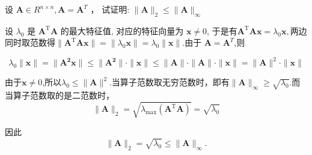 \begin{tcolorbox}[enhanced,colback=10,colframe=9,breakable,coltitle=green!25!black,title=2024]
  
设 $\boldsymbol{A} \in R^{n \times n}, \boldsymbol{A}=\boldsymbol{A}^{T} $ ，
试证明: $ \|\boldsymbol{A}\|_{2} \leq\|\boldsymbol{A}\|_{\infty} $
\tcblower

 设 $ \lambda_0 $ 是 $\boldsymbol{A}^{\mathrm{T}} \boldsymbol{A} $ 的最大特征值, 对应的特征向量为 $\boldsymbol{x} \neq 0 $, 于是有$\boldsymbol{A}^{\mathrm{T}} \boldsymbol{A x}=\lambda_0 \boldsymbol{x},$两边同时取范数得$\|\boldsymbol{A}^{\mathrm{T}} \boldsymbol{A x}\|=\|\lambda_0 \boldsymbol{x}\|=\lambda_0\|\boldsymbol{x}\|$.由于 $\boldsymbol{A}=\boldsymbol{A}^{T}$,则

 $$\lambda_0\|\boldsymbol{x}\|=\|\boldsymbol{A^2 x}\|\leqslant \|\boldsymbol{A^2}\|\cdot \|\boldsymbol{ x}\|\leqslant \|\boldsymbol{A}\|\cdot \|\boldsymbol{A}\|\cdot \|\boldsymbol{x}\|=\|\boldsymbol{A}\|^2 \cdot \|\boldsymbol{x}\|$$

 由于$\boldsymbol{x} \neq 0 $,所以$\lambda_0\leqslant \|\boldsymbol{A}\|^2$.当算子范数取无穷范数时，即有$\|\boldsymbol{A}\|_{\infty}\geqslant \sqrt{\lambda_0}$.而当算子范数取的是二范数时，
$$\|\boldsymbol{A}\|_{2}=\sqrt{\lambda_{\max}(\boldsymbol{A}^{\mathrm{T}} \boldsymbol{A })} =\sqrt{\lambda_0}$$
 
因此
$$
\|\boldsymbol{A}\|_{2}=\sqrt{\lambda_0} \leqslant\|\boldsymbol{A}\|_{\infty} .
$$
\end{tcolorbox}


